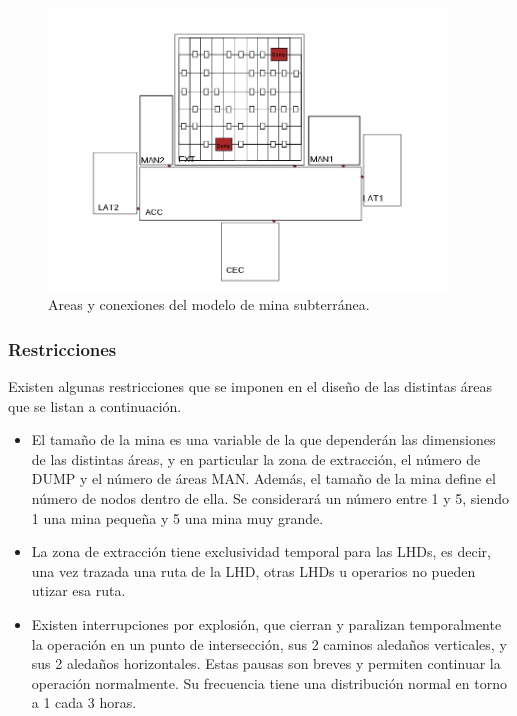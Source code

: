 \documentclass[10pt,preprint,onecolumn]{article}
\begin{document}
\begin{figure}[H]
    \centering
    \includegraphics[width=400px]{underground2.png}
    \caption{Areas y conexiones del modelo de mina subterránea.}
    \label{fig:underground}
\end{figure}

\subsubsection{Restricciones}

Existen algunas restricciones que se imponen en el diseño de las distintas áreas que se listan a continuación.

\begin{itemize}

    \item El tamaño de la mina es una variable de la que dependerán las dimensiones de las distintas áreas, y en particular la zona de extracción, el número de DUMP y el número de áreas MAN. Además, el tamaño de la mina define el número de nodos dentro de ella. Se considerará un número entre 1 y 5, siendo 1 una mina pequeña y 5 una mina muy grande.
    
    \item La zona de extracción tiene exclusividad temporal para las LHDs, es decir, una vez trazada una ruta de la LHD, otras LHDs u operarios no pueden utizar esa ruta. 
    
    \item Existen interrupciones por explosión, que cierran y paralizan temporalmente la operación en un punto de intersección, sus 2 caminos aledaños verticales, y sus 2 aledaños horizontales. Estas pausas son breves y permiten continuar la operación normalmente. Su frecuencia tiene una distribución normal en torno a 1 cada 3 horas. 
    
\end{itemize}
\end{document}

